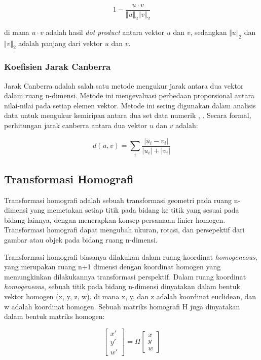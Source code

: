 \begin{equation}
	1-\frac{u\cdot v}{\Vert u\Vert_2\Vert v\Vert_2}
\end{equation}

\noindent di mana $u\cdot v$ adalah hasil \emph{dot product} antara vektor $u$ dan $v$, sedangkan $\Vert u\Vert_2$ dan $\Vert v\Vert_2$ adalah panjang dari vektor $u$ dan $v$.

\subsubsection{Koefisien Jarak Canberra}
Jarak Canberra adalah salah satu metode mengukur jarak antara dua vektor dalam ruang n-dimensi. Metode ini mengevaluasi perbedaan proporsional antara
nilai-nilai pada setiap elemen vektor. Metode ini sering digunakan dalam analisis data untuk mengukur kemiripan antara dua set data numerik
\cite{clusteringSumayiaAlAnazi}, \cite{sneath1973numerical}. Secara formal, perhitungan jarak canberra antara dua vektor $u$ dan $v$ adalah:

\begin{equation}
	d(u,v)=\sum_i\frac{\left | u_i-v_i \right |}{\left | u_i \right |+\left | v_i \right |}
\end{equation}

\subsection{Transformasi Homografi}
Transformasi homografi adalah sebuah transformasi geometri pada ruang n-dimensi yang memetakan setiap titik pada bidang ke titik yang sesuai pada bidang
lainnya, dengan menerapkan konsep persamaan linier homogen. Transformasi homografi dapat mengubah ukuran, rotasi, dan persepektif dari gambar atau objek pada
bidang ruang n-dimensi.

Transformasi homografi biasanya dilakukan dalam ruang koordinat \emph{homogeneous}, yang merupakan ruang n+1 dimensi dengan koordinat homogen yang memungkinkan
dilakukannya transformasi perspektif. Dalam ruang koordinat \emph{homogeneous}, sebuah titik pada bidang n-dimensi dinyatakan dalam bentuk vektor homogen (x,
y, z, w), di mana x, y, dan z adalah koordinat euclidean, dan w adalah koordinat homogen. Sebuah matriks homografi H juga dinyatakan dalam bentuk matriks
homogen:

\begin{equation}
	\begin{bmatrix}
		x' \\
		y' \\
		w'
	\end{bmatrix}=H\begin{bmatrix}
		x \\
		y \\
		w
	\end{bmatrix}
\end{equation}

